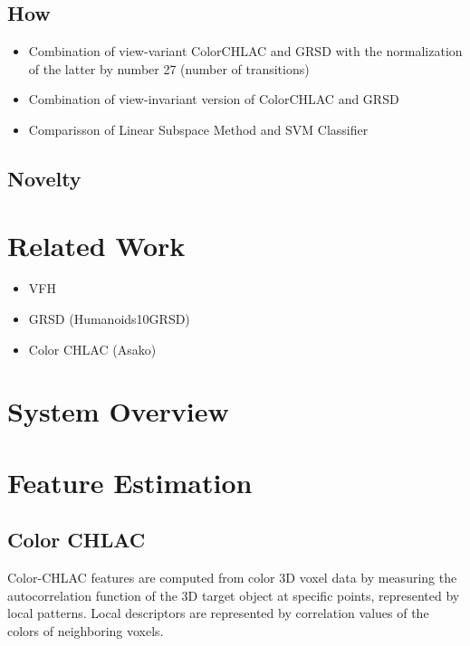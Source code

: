 \documentclass[conference]{sty/IEEEtran}
\begin{document}
\subsection{How}
\begin{itemize}
\item Combination of view-variant ColorCHLAC and GRSD with the
normalization of the latter by number 27 (number of transitions)
\item Combination of view-invariant version of ColorCHLAC and GRSD
\item Comparisson of Linear Subspace Method and SVM Classifier
\end{itemize}

\subsection{Novelty}


\section{Related Work}
\begin{itemize}
\item VFH
\item GRSD (Humanoids10GRSD)\cite{kalman1960new} 
\item Color CHLAC (Asako)\cite{kanezaki2010icra}\cite{kanezaki2010tvc}
\end{itemize}

\section{System Overview}


\section{Feature Estimation}

\subsection{Color CHLAC}
Color-CHLAC features are computed from color 3D voxel data by measuring 
    the autocorrelation function of the 3D target object at specific points, 
    represented by local patterns.
Local descriptors are represented by correlation values of the colors of neighboring voxels.
\end{document}
